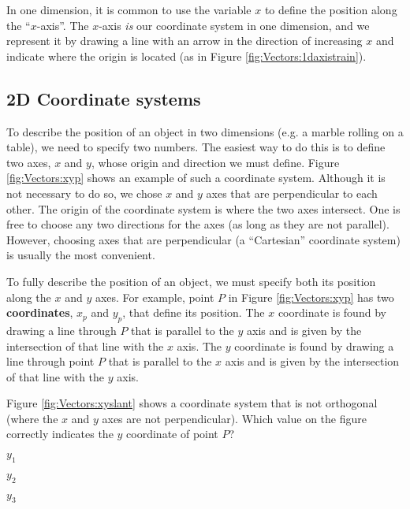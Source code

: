 In one dimension, it is common to use the variable $x$ to define the position along the ``$x$-axis''. The $x$-axis \textit{is} our coordinate system in one dimension, and we represent it by drawing a line with an arrow in the direction of increasing $x$ and indicate where the origin is located (as in Figure \ref{fig:Vectors:1daxistrain}).

 
\subsection{2D Coordinate systems}
To describe the position of an object in two dimensions (e.g. a marble rolling on a table), we need to specify two numbers. The easiest way to do this is to define two axes, $x$ and $y$, whose origin and direction we must define. Figure \ref{fig:Vectors:xyp} shows an example of such a coordinate system. Although it is not necessary to do so, we chose $x$ and $y$ axes that are perpendicular to each other. The origin of the coordinate system is where the two axes intersect. One is free to choose any two directions for the axes (as long as they are not parallel). However, choosing axes that are perpendicular (a ``Cartesian'' coordinate system) is usually the most convenient.

To fully describe the position of an object, we must specify both its position along the $x$ and $y$ axes. For example, point $P$ in Figure \ref{fig:Vectors:xyp} has two \textbf{coordinates}, $x_p$ and $y_p$, that define its position. The $x$ coordinate is found by drawing a line through $P$ that is parallel to the $y$ axis and is given by the intersection of that line with the $x$ axis. The $y$ coordinate is found by drawing a line through point $P$ that is parallel to the $x$ axis and is given by the intersection of that line with the $y$ axis.

\begin{checkpoint}
\begin{MCquestion}{Figure \ref{fig:Vectors:xyslant} shows a coordinate system that is not orthogonal (where the $x$ and $y$ axes are not perpendicular). Which value on the figure correctly indicates the $y$ coordinate of point $P$?
}
\item $y_1$ \correct
\item $y_2$
\item $y_3$
\end{MCquestion}
\end{checkpoint}


